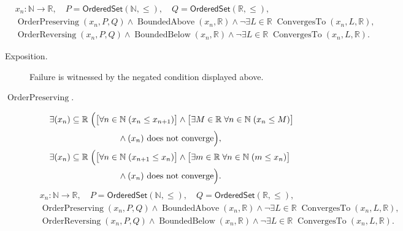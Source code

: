 \begin{remark*}
\[
\begin{aligned}
&x_n\colon\mathbb{N}\to\mathbb{R},\quad
P=\mathsf{OrderedSet}(\mathbb{N},\leq),\quad
Q=\mathsf{OrderedSet}(\mathbb{R},\leq),\\
&\operatorname{OrderPreserving}(x_n,P,Q)
\land
\operatorname{BoundedAbove}(x_n,\mathbb{R})
\land
\neg\exists L\in\mathbb{R}\;\operatorname{ConvergesTo}(x_n,L,\mathbb{R}),\\
&\operatorname{OrderReversing}(x_n,P,Q)
\land
\operatorname{BoundedBelow}(x_n,\mathbb{R})
\land
\neg\exists L\in\mathbb{R}\;\operatorname{ConvergesTo}(x_n,L,\mathbb{R}).
\end{aligned}
\]
\end{remark*}
\begin{remark*}
\begin{description}
  \item[Exposition.]
Failure is witnessed by the negated condition displayed above.
  \item[\(\operatorname{OrderPreserving}.\)]
\[
\begin{aligned}
&\exists (x_n)\subseteq\mathbb{R}\;\Bigl(
  \bigl[\forall n\in\mathbb{N}\;(x_n\le x_{n+1})\bigr]
  \land
  \bigl[\exists M\in\mathbb{R}\;\forall n\in\mathbb{N}\;(x_n\le M)\bigr]\\
&\qquad\qquad\qquad\qquad
  \land
  \text{$(x_n)$ does not converge}
\Bigr),\\
&\exists (x_n)\subseteq\mathbb{R}\;\Bigl(
  \bigl[\forall n\in\mathbb{N}\;(x_{n+1}\le x_n)\bigr]
  \land
  \bigl[\exists m\in\mathbb{R}\;\forall n\in\mathbb{N}\;(m\le x_n)\bigr]\\
&\qquad\qquad\qquad\qquad
  \land
  \text{$(x_n)$ does not converge}
\Bigr).
\end{aligned}
\]
\[
\begin{aligned}
&x_n\colon\mathbb{N}\to\mathbb{R},\quad
P=\mathsf{OrderedSet}(\mathbb{N},\leq),\quad
Q=\mathsf{OrderedSet}(\mathbb{R},\leq),\\
&\operatorname{OrderPreserving}(x_n,P,Q)
\land
\operatorname{BoundedAbove}(x_n,\mathbb{R})
\land
\neg\exists L\in\mathbb{R}\;\operatorname{ConvergesTo}(x_n,L,\mathbb{R}),\\
&\operatorname{OrderReversing}(x_n,P,Q)
\land
\operatorname{BoundedBelow}(x_n,\mathbb{R})
\land
\neg\exists L\in\mathbb{R}\;\operatorname{ConvergesTo}(x_n,L,\mathbb{R}).
\end{aligned}
\]
\end{description}
\end{remark*}

